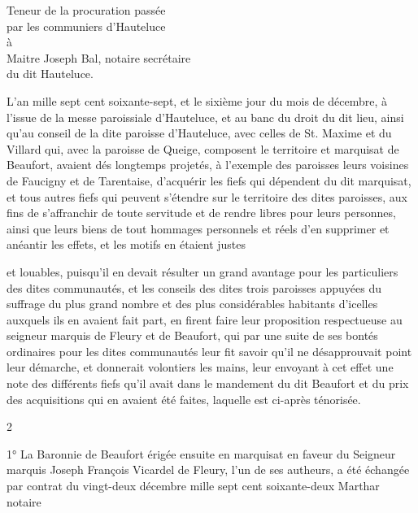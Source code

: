 \documentclass[a4paper,twoside,openany]{article}
\begin{document}
\begin{flushright}
Teneur de la procuration passée		
\\par les communiers d’Hauteluce		
\\à				
\\Maitre Joseph Bal, notaire secrétaire		
\\du dit Hauteluce.	
\end{flushright}

L’an mille sept cent soixante-sept, et le sixième
jour du mois de décembre, à l’issue de la messe
paroissiale d’Hauteluce, et au \gls{banc du droit}
du dit lieu, ainsi qu’au conseil de la dite paroisse
d’Hauteluce, avec celles de St. Maxime et du Villard
qui, avec la paroisse de Queige, composent
le territoire et marquisat de Beaufort, avaient
dés longtemps projetés, à l’exemple des paroisses
leurs voisines de Faucigny et de Tarentaise,
d’acquérir les fiefs qui dépendent du dit marquisat, et
tous autres fiefs qui peuvent s’étendre
sur le territoire des dites paroisses, aux fins de
s’affranchir de toute servitude et de rendre
libres pour leurs personnes, ainsi que leurs biens de
tout hommages personnels et réels d’en supprimer
et anéantir les effets, et les motifs en étaient justes


et louables, puisqu’il en devait résulter un grand
avantage pour les particuliers des dites communautés,
et les conseils des dites trois paroisses appuyées du
suffrage du plus grand nombre et des plus
considérables habitants d’icelles auxquels ils en
avaient fait part, en firent faire leur  proposition
respectueuse au seigneur marquis de Fleury et
de Beaufort, qui par une suite de ses bontés
ordinaires pour les dites communautés leur fit
savoir qu’il ne désapprouvait point leur
démarche, et donnerait volontiers les mains,
leur envoyant à cet effet une note des différents
fiefs qu’il avait dans le mandement du dit Beaufort
et du prix des acquisitions qui en avaient été faites,
laquelle est ci-après ténorisée.

\begin{center}
2
\end{center}
1° La Baronnie de Beaufort érigée ensuite en
marquisat en faveur du Seigneur marquis Joseph
François Vicardel de Fleury, l’un de ses autheurs,
a été échangée par contrat du vingt-deux décembre
mille sept cent soixante-deux Marthar notaire
\end{document}
